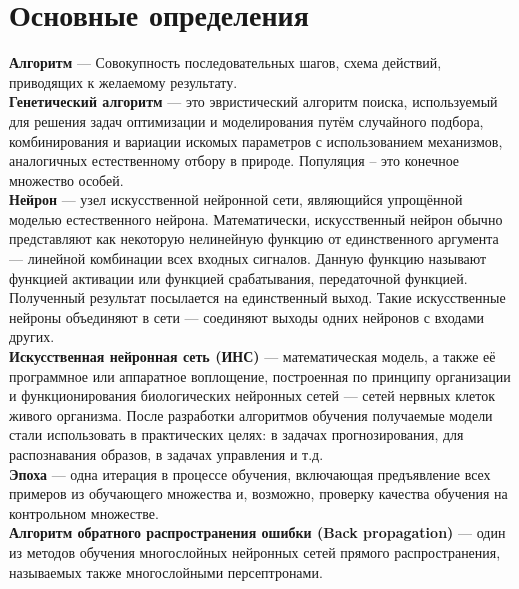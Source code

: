 \section{Основные определения}

 \textbf{Алгоритм} — Совокупность последовательных шагов, схема действий, приводящих к желаемому результату. \\

 \textbf{Генетический алгоритм} — это эвристический алгоритм поиска, используемый для решения задач оптимизации и моделирования путём случайного подбора, комбинирования и вариации искомых параметров с использованием механизмов, аналогичных естественному отбору в природе.
Популяция – это конечное множество особей.\\

 \textbf{Нейрон} — узел искусственной нейронной сети, являющийся упрощённой моделью естественного нейрона. Математически, искусственный нейрон обычно представляют как некоторую нелинейную функцию от единственного аргумента — линейной комбинации всех входных сигналов. Данную функцию называют функцией активации или функцией срабатывания, передаточной функцией. Полученный результат посылается на единственный выход. Такие искусственные нейроны объединяют в сети — соединяют выходы одних нейронов с входами других. \\

 \textbf{Искусственная нейронная сеть (ИНС)}  — математическая модель, а также её программное или аппаратное воплощение, построенная по принципу организации и функционирования биологических нейронных сетей — сетей нервных клеток живого организма. После разработки алгоритмов обучения получаемые модели стали использовать в практических целях: в задачах прогнозирования, для распознавания образов, в задачах управления и т.д. \\

 \textbf{Эпоха} — одна итерация в процессе обучения, включающая предъявление всех примеров из обучающего множества и, возможно, проверку качества обучения на контрольном множестве. \\

 \textbf{Алгоритм обратного распространения ошибки (Back propagation)} — один из методов обучения многослойных нейронных сетей прямого распространения, называемых также многослойными персептронами.\\